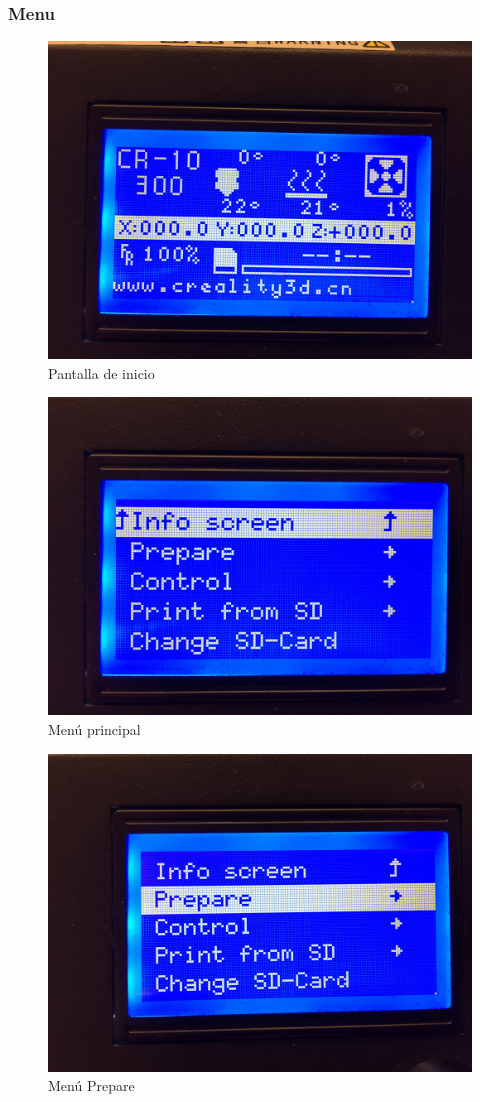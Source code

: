 \documentclass{beamer}
\begin{document}
	\subsubsection{Menu}
	\begin{frame}
		\begin{figure}
			\includegraphics[height=0.6\textwidth]{images/main}
			\caption{Pantalla de inicio}
		\end{figure}
	\end{frame}
	\begin{frame}
		\begin{figure}
			\includegraphics[height=0.6\textwidth]{images/menu}
			\caption{Menú principal}
		\end{figure}
	\end{frame}
	\begin{frame}
		\begin{figure}
			\includegraphics[height=0.6\textwidth]{images/menu_prepare}
			\caption{Menú Prepare}
		\end{figure}
	\end{frame}
\end{document}
